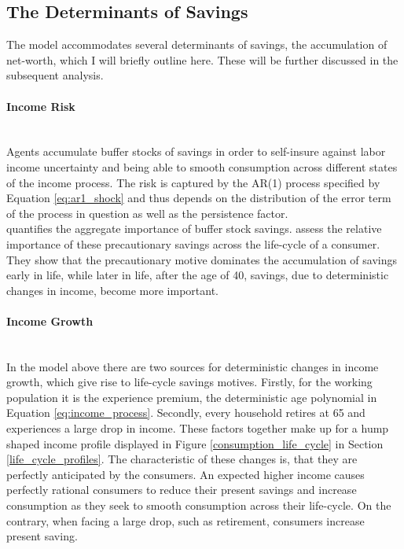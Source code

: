 \documentclass[a4paper,12pt,legno]{article}
\newcommand{\myparagraph}[1]{\paragraph{#1}\mbox{}\\}
\begin{document}
\subsection{The Determinants of Savings}
\label{determinants}
The model accommodates several determinants of savings, the accumulation of net-worth, which I will briefly outline here. These will be further discussed in the subsequent analysis. 


\myparagraph{Income Risk} Agents accumulate buffer stocks of savings in order to self-insure against labor income uncertainty and being able to smooth consumption across different states of the income process. The risk is captured by the AR(1) process specified by Equation \ref{eq:ar1_shock} and thus depends on the distribution of the error term of the process in question as well as the persistence factor. \\
\cite{aiyagari1994} quantifies the aggregate importance of buffer stock savings. \cite{Gourinchas&Parker2002} assess the relative importance of these precautionary savings across the life-cycle of a consumer. They show that the precautionary motive dominates the accumulation of savings early in life, while later in life, after the age of 40, savings, due to deterministic changes in income, become more important. 

\myparagraph{Income Growth} In the model above there are two sources for deterministic changes in income growth, which give rise to life-cycle savings motives. Firstly, for the working population it is the experience premium, the deterministic age polynomial in Equation \ref{eq:income_process}. Secondly, every household retires at 65 and experiences a large drop in income. These factors together make up for a hump shaped income profile displayed in Figure \ref{consumption_life_cycle} in Section \ref{life_cycle_profiles}. The characteristic of these changes is, that they are perfectly anticipated by the consumers. An expected higher income causes perfectly rational consumers to reduce their present savings and increase consumption as they seek to smooth consumption across their life-cycle. On the contrary, when facing a large drop, such as retirement, consumers increase present saving. 
\end{document}
